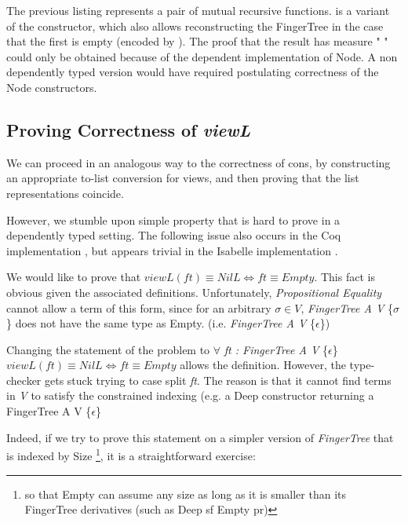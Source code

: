 \documentclass[12pt,twoside,notitlepage]{report}
\begin{document}
The previous listing represents a pair of mutual recursive functions.  is a variant of the  constructor, which also allows reconstructing the FingerTree in the case that the first  is empty (encoded by ). The proof that the result has measure "      " could only be obtained because of the dependent implementation of Node. A non dependently typed version would have required postulating correctness of the Node constructors. 

\subsection{Proving Correctness of \textit{viewL}}

We can proceed in an analogous way to the correctness of cons, by constructing an appropriate to-list conversion for views, and then proving that the list representations coincide.

However, we stumble upon simple property that is hard to prove in a dependently typed setting. The following issue also occurs in the Coq implementation \cite{coq}, but appears trivial in the Isabelle implementation \cite{isabelle}.

We would like to prove that $viewL(ft)\equiv NilL \iff ft \equiv Empty$. This fact is obvious given the associated definitions. Unfortunately, \textit{Propositional Equality} cannot allow a term of this form, since for an arbitrary $\sigma \in V$, \textit{FingerTree A V} \{$\sigma$\} does not have the same type as Empty. (i.e. \textit{FingerTree A V} \{$\epsilon$\})

Changing the statement of the problem to $\forall$ \textit{ft : FingerTree A V} \{$\epsilon$\} $viewL(ft) \equiv NilL \iff ft \equiv Empty$ allows the definition. However, the type-checker gets stuck trying to case split \textit{ft}. The reason is that it cannot find terms in \textit{V} to satisfy the constrained indexing (e.g. a Deep constructor returning a FingerTree A V \{$\epsilon$\}\

Indeed, if we try to prove this statement on a simpler version of \textit{FingerTree} that is indexed by Size \footnote{so that Empty can assume any size as long as it is smaller than its FingerTree derivatives (such as Deep sf Empty pr)}, it is a straightforward exercise: 
\end{document}
